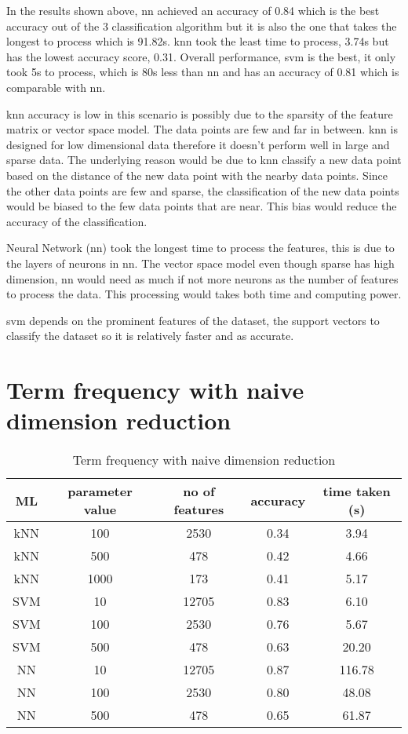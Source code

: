 In the results shown above, \ac{nn} achieved an accuracy of 0.84 which is the best accuracy out of the 3 classification algorithm but it is also the one that takes the longest to process which is 91.82s. \Ac{knn} took the least time to process, 3.74s but has the lowest accuracy score, 0.31. Overall performance, \ac{svm} is the best, it only took 5s to process, which is 80s less than \ac{nn} and has an accuracy of 0.81 which is comparable with \ac{nn}. 

\Ac{knn} accuracy is low in this scenario is possibly due to the sparsity of the feature matrix or vector space model. The data points are few and far in between. \Ac{knn} is designed for low dimensional data therefore it doesn't perform well in large and sparse data. The underlying reason would be due to \ac{knn} classify a new data point based on the distance of the new data point with the nearby data points. Since the other data points are few and sparse, the classification of the new data points would be biased to the few data points that are near. This bias would reduce the accuracy of the classification. \cite{knnDrawback}

Neural Network (\ac{nn}) took the longest time to process the features, this is due to the layers of neurons in \ac{nn}. The vector space model even though sparse has high dimension, \ac{nn} would need as much if not more neurons as the number of features to process the data. This processing would takes both time and computing power.

\Ac{svm} depends on the prominent features of the dataset, the support vectors to classify the dataset so it is relatively faster and as accurate.

\section{Term frequency with naive dimension reduction}

\begin{table} [ht]
	\centering
	\begin{tabular}{|| c | c | c | c | c||}
		\hline
		ML & parameter value & no of features & accuracy & time taken (s) \\ [0.5ex]
		\hline\hline
		kNN & 100 & 2530 & 0.34 & 3.94 \\ 
		\hline
		kNN & 500 & 478 & 0.42 & 4.66 \\ 
		\hline
		kNN & 1000 & 173 & 0.41 & 5.17 \\ 
		\hline\hline
		SVM & 10 & 12705 & 0.83 & 6.10 \\
		\hline
		SVM & 100 & 2530 & 0.76 & 5.67 \\
		\hline
		SVM & 500 & 478 & 0.63 & 20.20 \\
		\hline\hline
		NN & 10 & 12705 & 0.87 & 116.78 \\
		\hline
		NN & 100 & 2530 & 0.80 & 48.08 \\
		\hline
		NN & 500 & 478 & 0.65 & 61.87 \\
		\hline
	\end{tabular}
\caption{Term frequency with naive dimension reduction}
\label{tbl:termFrequencyNaive}
\end{table}

